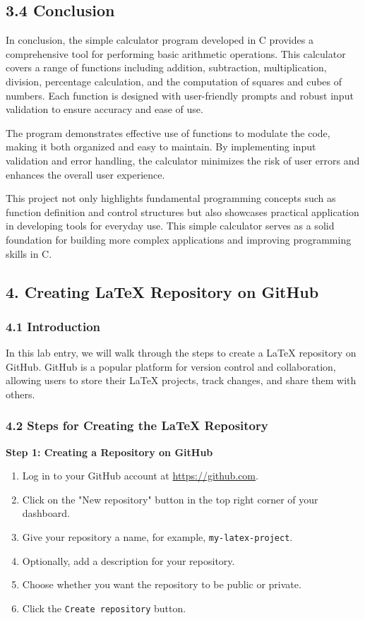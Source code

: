 \documentclass[a4paper,12pt]{article}
\begin{document}
\subsection*{3.4 Conclusion}
In conclusion, the simple calculator program developed in C provides a comprehensive tool for performing basic arithmetic operations. This calculator covers a range of functions including addition, subtraction, multiplication, division, percentage calculation, and the computation of squares and cubes of numbers. Each function is designed with user-friendly prompts and robust input validation to ensure accuracy and ease of use.

The program demonstrates effective use of functions to modulate the code, making it both organized and easy to maintain. By implementing input validation and error handling, the calculator minimizes the risk of user errors and enhances the overall user experience.

This project not only highlights fundamental programming concepts such as function definition and control structures but also showcases practical application in developing tools for everyday use. This simple calculator serves as a solid foundation for building more complex applications and improving programming skills in C.

\newpage
\subsection*{4. Creating LaTeX Repository on GitHub}

\subsubsection*{4.1 Introduction}
In this lab entry, we will walk through the steps to create a LaTeX repository on GitHub. GitHub is a popular platform for version control and collaboration, allowing users to store their LaTeX projects, track changes, and share them with others.

\subsubsection*{4.2 Steps for Creating the LaTeX Repository}

\textbf{Step 1: Creating a Repository on GitHub}
\begin{enumerate}
    \item Log in to your GitHub account at \url{https://github.com}.
    \item Click on the "New repository" button in the top right corner of your dashboard.
    \item Give your repository a name, for example, \texttt{my-latex-project}.
    \item Optionally, add a description for your repository.
    \item Choose whether you want the repository to be public or private.
    \item Click the \texttt{Create repository} button.
\end{enumerate}
\end{document}
